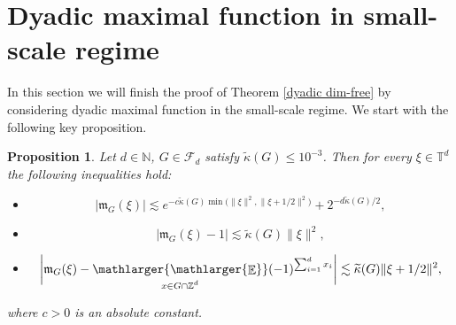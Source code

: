 \documentclass[a4paper,oneside, reqno]{amsart}
\numberwithin{equation}{section}
\newtheorem{Prop}[Thm]{Proposition}
\theoremstyle{definition}%
\theoremstyle{definition}
\theoremstyle{definition}%
\theoremstyle{definition}
\newcommand{\E}{\mathop{\mathbb{E}}}
\newcommand{\Z}{\mathbb{Z}}
\newcommand{\N}{\mathbb{N}}
\newcommand{\T}{\mathbb{T}}
\newcommand{\se}[1]{\underset{_{\substack{#1}}}{\mathlarger{\mathlarger{\E}}}}
\begin{document}
\section{Dyadic maximal function in small-scale regime}
In this section we will finish the proof of Theorem \ref{dyadic dim-free} by considering dyadic maximal function in the small-scale regime.
We start with the following key proposition.
\begin{Prop} \label{prop:3.6}
Let $d \in \N$, $G \in \mathcal{F}_d$ satisfy $\widetilde{\kappa}(G) \le 10^{-3}$. Then for every $\xi \in \T^d$ the following inequalities hold:
    \begin{itemize}
        \item \begin{equation} \label{eq:3.10}
        |\mathfrak{m}_G(\xi)| \lesssim e^{- c\widetilde{\kappa}(G) \min\big(\|\xi\|^2, \| \xi +1/2\|^2 \big)} + 2^{-d\widetilde{\kappa}(G)/2},
    \end{equation}
    \item \begin{equation} \label{eq:3.11}
    |\mathfrak{m}_G(\xi)-1| \lesssim \widetilde{\kappa}(G) \| \xi\|^2,
    \end{equation}
    \item 
    \begin{equation} \label{eq:3.12}
    \bigg|\mathfrak{m}_G(\xi)-\se{x \in G \cap \Z^d} (-1)^{\sum_{i=1}^d x_i}\bigg| \lesssim  \widetilde{\kappa}(G) \|\xi+1/2\|^2,
    \end{equation}
    \end{itemize}
    where $c>0$ is an absolute constant.
\end{Prop}
\end{document}
